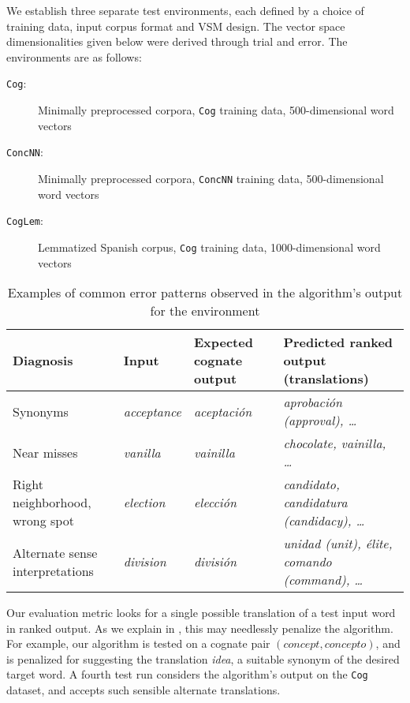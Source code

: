\documentclass[11pt]{article}
\begin{document}
We establish three separate test environments, each defined by a choice of training data,
input corpus format and VSM design. The vector space dimensionalities given below
were derived through trial and error. %
The environments are as follows:
\begin{description}
\item[\texttt{Cog}:] Minimally preprocessed corpora, \texttt{Cog} training data, 500-dimensional word vectors %
\item[\texttt{ConcNN}:] Minimally preprocessed corpora, \texttt{ConcNN} training data, 500-dimensional word vectors %
\item[\texttt{CogLem}:] Lemmatized Spanish corpus, \texttt{Cog} training data, 1000-dimensional word vectors %
\end{description}

\begin{table*}[htb!]
    \centering
    \small
    \begin{tabular}[t]{l lll}
    \toprule
    Diagnosis & Input & Expected cognate output & Predicted ranked output (translations) \\
    \midrule
    Synonyms & \emph{acceptance} & \emph{aceptación} & \emph{aprobación (approval), \dots} \\
    Near misses & \emph{vanilla} & \emph{vainilla} & \emph{chocolate, vainilla, \dots} \\
    Right neighborhood, wrong spot & \emph{election} & \emph{elección} & \emph{candidato, candidatura (candidacy), \dots} \\
    Alternate sense interpretations & \emph{division} & \emph{división} & \emph{unidad (unit), élite, comando (command), \dots} \\
    \bottomrule
    \end{tabular}
    \caption{Examples of common error patterns observed in the algorithm's output for
        the  environment}
    \label{tbl:errors}
\end{table*}

Our evaluation metric looks for a single possible translation of a test input word in
ranked output. As we explain in , this may needlessly penalize
the algorithm.
For example, our algorithm is
tested on a cognate pair $(\textit{concept}, \textit{concepto})$, and is penalized for
suggesting the translation \textit{idea}, a suitable synonym of the desired target word.
A fourth test run  considers the algorithm's output on the \texttt{Cog} dataset,
and accepts such sensible alternate translations. %
\end{document}
